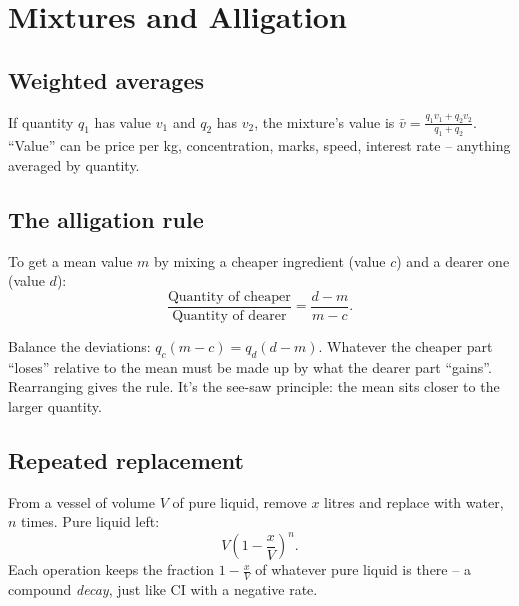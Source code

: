 \documentclass[11pt,a4paper,openany]{report}
\begin{document}
\chapter{Mixtures and Alligation}\label{ch:mix}

\section{Weighted averages}
If quantity $q_1$ has value $v_1$ and $q_2$ has $v_2$, the mixture's value is $\bar v=\frac{q_1v_1+q_2v_2}{q_1+q_2}$.
``Value'' can be price per kg, concentration, marks, speed, interest rate -- anything averaged by quantity.

\section{The alligation rule}
To get a mean value $m$ by mixing a cheaper ingredient (value $c$) and a dearer one (value $d$):
\[\frac{\text{Quantity of cheaper}}{\text{Quantity of dearer}}=\frac{d-m}{m-c}.\]
\begin{center}
\end{center}
\begin{why}
Balance the deviations: $q_c(m-c)=q_d(d-m)$. Whatever the cheaper part ``loses'' relative to the mean must be
made up by what the dearer part ``gains''. Rearranging gives the rule. It's the see-saw principle: the mean sits closer to the larger quantity.
\end{why}

\section{Repeated replacement}
From a vessel of volume $V$ of pure liquid, remove $x$ litres and replace with water, $n$ times. Pure liquid left:
\[V\left(1-\frac xV\right)^n.\]
Each operation keeps the fraction $1-\frac xV$ of whatever pure liquid is there -- a compound \emph{decay}, just like CI with a negative rate.
\end{document}
